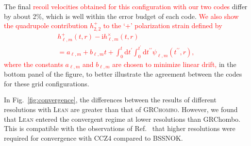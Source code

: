 \documentclass[floats,floatfix,showpacs,amssymb,prd,twocolumn,superscriptaddress,nofootinbib,nolongbibliography,reprint]{revtex4-2}
\newcommand{\mr}[1]{{\textcolor{cyan}{\sf{[MR: #1]}} }}
\newcommand{\new}[1]{{\textcolor{red}{ #1} }}
\newcommand{\rmd}{\mathrm{d}}
\begin{document}
The final \new{recoil velocities obtained for this configuration with
our two codes} differ by about 2\%, which is well within the error budget 
of each code. %
\new{We also show the quadrupole contribution
$h^+_{2,2}$ to the `+' polarization strain defined by \cite{Bishop:2016lgv}
\begin{multline}
    h^+_{\ell,m}(t,r)-\mathrm{i}h^\times_{\ell,m}(t,r) \\
    = a_{\ell,m} + b_{\ell,m}t + \int_0^t\rmd t^\prime\int_0^{t^\prime}
    \rmd t^{\prime\prime}\psi_{\ell,m}(t^{\prime\prime},r),
    \label{eq:strain}
\end{multline}
where the constants $a_{\ell,m}$ and $b_{\ell,m}$ are chosen to minimize 
linear drift,}
in the bottom panel of the figure, to better illustrate the agreement
between the codes for these grid configurations.

In Fig.~\ref{fig:convergence}, the differences between the results of 
different resolutions with \textsc{Lean} are greater than that of
\textsc{GRChombo}. However, we found that \textsc{Lean} entered the 
convergent regime at lower resolutions than GRChombo. This is compatible 
with the observations of Ref.~\cite{Alic:2011gg} that higher resolutions 
were required for convergence with CCZ4 compared to BSSNOK.




\end{document}
